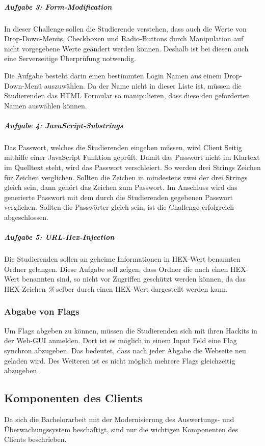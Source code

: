 \subparagraph{Aufgabe 3: Form-Modification}\label{subpara:Aufgabe_3_Form-Modification}
In dieser Challenge sollen die Studierende verstehen, dass auch die Werte von Drop-Down-Menüs, Checkboxen und Radio-Buttons durch Manipulation auf nicht vorgegebene Werte geändert werden können. Deshalb ist bei diesen auch eine Serverseitige Überprüfung notwendig.

Die Aufgabe besteht darin einen bestimmten Login Namen aus einem Drop-Down-Menü auszuwählen. Da der Name nicht in dieser Liste ist, müssen die Studierenden das HTML Formular so manipulieren, dass diese den geforderten Namen auswählen können.

\subparagraph{Aufgabe 4: JavaScript-Substrings}\label{subpara:Aufgabe_4_JavaScript-Substrings}
Das Passwort, welches die Studierenden eingeben müssen, wird Client Seitig mithilfe einer JavaScript Funktion geprüft. Damit das Passwort nicht im Klartext im Quelltext steht, wird das Passwort verschleiert. So werden drei Strings Zeichen für Zeichen verglichen. Sollten die Zeichen in mindestens zwei der drei Strings gleich sein, dann gehört das Zeichen zum Passwort. Im Anschluss wird das generierte Passwort mit dem durch die Studierenden gegebenen Passwort verglichen. Sollten die Passwörter gleich sein, ist die Challenge erfolgreich abgeschlossen.

\subparagraph{Aufgabe 5: URL-Hex-Injection}\label{subpara:Aufgabe_5_URL-Hex-Injection}
Die Studierenden sollen an geheime Informationen in HEX-Wert benannten Ordner gelangen. Diese Aufgabe soll zeigen, dass Ordner die nach einen HEX-Wert benannten sind, so nicht vor Zugriffen geschützt werden können, da das HEX-Zeichen \textit{\%} selber durch einen HEX-Wert dargestellt werden kann.

\subsubsection{Abgabe von Flags}\label{subsubsec:Abgabe_von_Flags}
Um Flags abgeben zu können, müssen die Studierenden sich mit ihren Hackits in der Web-GUI anmelden. Dort ist es möglich in einem Input Feld eine Flag synchron abzugeben. Das bedeutet, dass nach jeder Abgabe die Webseite neu geladen wird. Des Weiteren ist es nicht möglich mehrere Flags gleichzeitig abzugeben.

\subsection{Komponenten des Clients}\label{subsec:Komponente_des_Clients}
Da sich die Bachelorarbeit mit der Modernisierung des Auswertungs- und Überwachungssystem beschäftigt, sind nur die wichtigen Komponenten des Clients beschrieben.

